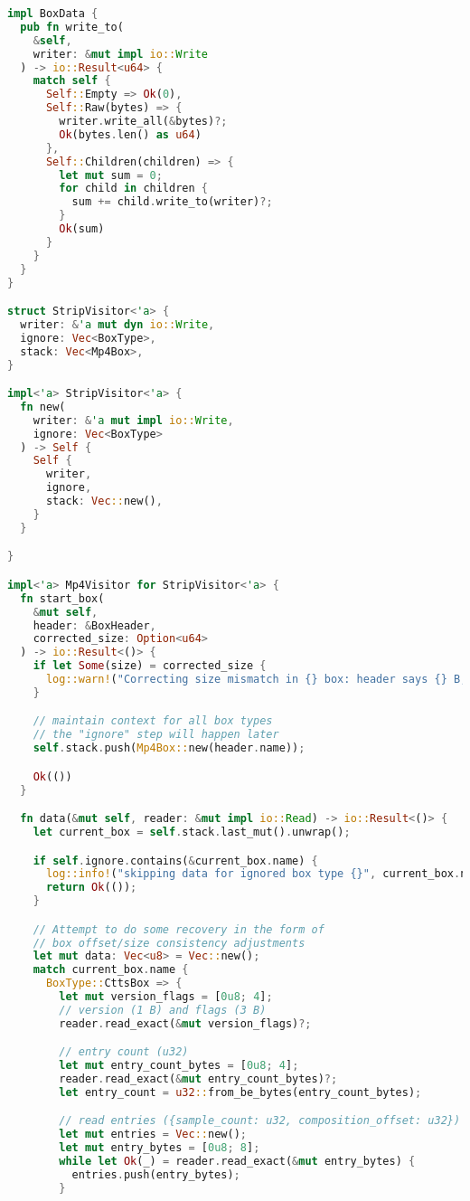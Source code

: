 \begin{lstlisting}[language=Rust]
impl BoxData {
  pub fn write_to(
    &self,
    writer: &mut impl io::Write
  ) -> io::Result<u64> {
    match self {
      Self::Empty => Ok(0),
      Self::Raw(bytes) => {
        writer.write_all(&bytes)?;
        Ok(bytes.len() as u64)
      },
      Self::Children(children) => {
        let mut sum = 0;
        for child in children {
          sum += child.write_to(writer)?;
        }
        Ok(sum)
      }
    }
  }
}

struct StripVisitor<'a> {
  writer: &'a mut dyn io::Write,
  ignore: Vec<BoxType>,
  stack: Vec<Mp4Box>,
}

impl<'a> StripVisitor<'a> {
  fn new(
    writer: &'a mut impl io::Write,
    ignore: Vec<BoxType>
  ) -> Self {
    Self {
      writer,
      ignore,
      stack: Vec::new(),
    }
  }

}

impl<'a> Mp4Visitor for StripVisitor<'a> {
  fn start_box(
    &mut self,
    header: &BoxHeader,
    corrected_size: Option<u64>
  ) -> io::Result<()> {
    if let Some(size) = corrected_size {
      log::warn!("Correcting size mismatch in {} box: header says {} B, but should actually be {} B", header.name, header.size, size);
    }

    // maintain context for all box types
    // the "ignore" step will happen later
    self.stack.push(Mp4Box::new(header.name));

    Ok(())
  }

  fn data(&mut self, reader: &mut impl io::Read) -> io::Result<()> {
    let current_box = self.stack.last_mut().unwrap();

    if self.ignore.contains(&current_box.name) {
      log::info!("skipping data for ignored box type {}", current_box.name);
      return Ok(());
    }

    // Attempt to do some recovery in the form of
    // box offset/size consistency adjustments
    let mut data: Vec<u8> = Vec::new();
    match current_box.name {
      BoxType::CttsBox => {
        let mut version_flags = [0u8; 4];
        // version (1 B) and flags (3 B)
        reader.read_exact(&mut version_flags)?;

        // entry count (u32)
        let mut entry_count_bytes = [0u8; 4];
        reader.read_exact(&mut entry_count_bytes)?;
        let entry_count = u32::from_be_bytes(entry_count_bytes);

        // read entries ({sample_count: u32, composition_offset: u32})
        let mut entries = Vec::new();
        let mut entry_bytes = [0u8; 8];
        while let Ok(_) = reader.read_exact(&mut entry_bytes) {
          entries.push(entry_bytes);
        }


\end{lstlisting}
